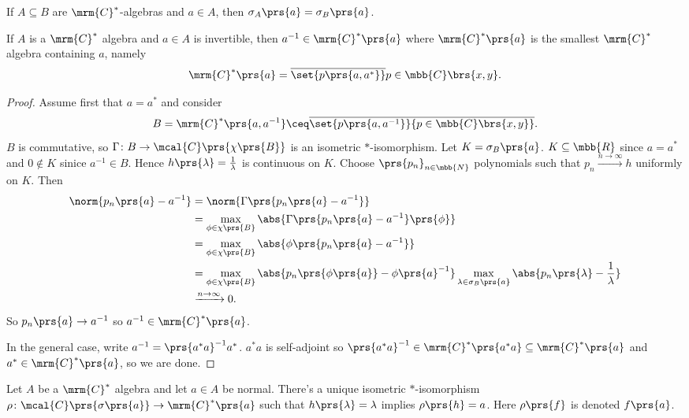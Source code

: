 \documentclass[10pt, twoside]{book}
\begin{document}
\begin{theorem}
If $A \subseteq B$ are $\mrm{C}^*$-algebras and $a \in A$, then $\sigma_A\prs{a} = \sigma_B\prs{a}$.
\end{theorem}

\begin{proposition}
If $A$ is a $\mrm{C}^*$ algebra and $a \in A$ is invertible, then $a^{-1} \in \mrm{C}^*\prs{a}$ where $\mrm{C}^*\prs{a}$ is the smallest $\mrm{C}^*$ algebra containing $a$, namely
\[\mrm{C}^*\prs{a} = \overline{\set{p\prs{a, a^*}}}{p \in \mbb{C}\brs{x,y}} \text{.}\]
\end{proposition}

\begin{proof}
Assume first that $a = a^*$ and consider \[B = \mrm{C}^*\prs{a, a^{-1}} \ceq \overline{\set{p\prs{a,a^{-1}}}{p \in \mbb{C}\brs{x,y}}} \text{.}\]
$B$ is commutative, so $\Gamma \colon B \to \mcal{C}\prs{\chi\prs{B}}$ is an isometric $*$-isomorphism. Let $K = \sigma_B\prs{a}$. $K \subseteq \mbb{R}$ since $a = a^*$ and $0 \notin K$ sinice $a^{-1} \in B$. Hence $h\prs{\lambda} = \frac{1}{\lambda}$ is continuous on $K$.
Choose $\prs{p_n}_{n \in \mbb{N}}$ polynomials such that $p_n \xrightarrow{n\to\infty} h$ uniformly on $K$. Then
\begin{align*}
\norm{p_n\prs{a} - a^{-1}} &= \norm{\Gamma\prs{p_n\prs{a} - a^{-1}}}
\\&= \max_{\phi \in \chi\prs{B}} \abs{\Gamma\prs{p_n\prs{a} - a^{-1}}\prs{\phi}}
\\&= \max_{\phi \in \chi\prs{B}} \abs{\phi\prs{p_n\prs{a} - a^{-1}}}
\\&= \max_{\phi \in \chi\prs{B}} \abs{p_n\prs{\phi\prs{a}} - \phi\prs{a}^{-1}}
\max_{\lambda \in \sigma_B\prs{a}} \abs{p_n\prs{\lambda} - \frac{1}{\lambda}}
\\&\xrightarrow{n\to\infty} 0
\text{.}
\end{align*}
So $p_n\prs{a} \to a^{-1}$ so $a^{-1} \in \mrm{C}^*\prs{a}$.

In the general case, write $a^{-1} = \prs{a^* a}^{-1} a^*$. $a^* a$ is self-adjoint so $\prs{a^* a}^{-1} \in \mrm{C}^*\prs{a^* a} \subseteq \mrm{C}^*\prs{a}$ and $a^* \in \mrm{C}^*\prs{a}$, so we are done.
\end{proof}

\begin{theorem}
Let $A$ be a $\mrm{C}^*$ algebra and let $a \in A$ be normal. There's a unique isometric $*$-isomorphism $\rho \colon \mcal{C}\prs{\sigma\prs{a}} \to \mrm{C}^*\prs{a}$ such that $h\prs{\lambda} = \lambda$ implies $\rho\prs{h} = a$. Here $\rho\prs{f}$ is denoted $f\prs{a}$.
\end{theorem}
\end{document}
